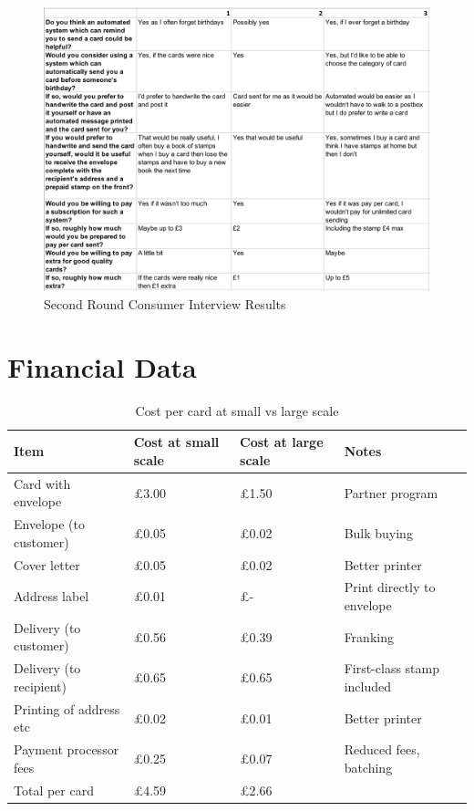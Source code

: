 \documentclass[10pt,a4paper]{article}
\begin{document}
\begin{appendices}
  \begin{figure}[!htb]
\includegraphics[width=1.0\linewidth]{primary_research_3.png}
    \caption{Second Round Consumer Interview Results}
  \end{figure}



\clearpage


\section{Financial Data}
\begin{table}[]
	\centering
	\caption{Cost per card at small vs large scale}
	\label{table:costpercard}
	\begin{tabular}{llll}
		Item                    & Cost at small scale & Cost at large scale & Notes                      \\ \hline
		Card with envelope      & £3.00               & £1.50               & Partner program       	 \\
		Envelope (to customer)  & £0.05               & £0.02               & Bulk buying                \\
		Cover letter            & £0.05               & £0.02               & Better printer             \\
		Address label           & £0.01               & £-                  & Print directly to envelope \\
		Delivery (to customer)  & £0.56               & £0.39               & Franking                   \\
		Delivery (to recipient) & £0.65               & £0.65               & First-class stamp included \\
		Printing of address etc & £0.02               & £0.01               & Better printer             \\
		Payment processor fees  & £0.25               & £0.07               & Reduced fees, batching     \\ \hline
		Total per card          & £4.59               & £2.66               &
	\end{tabular}
\end{table}


\end{appendices}
\end{document}
